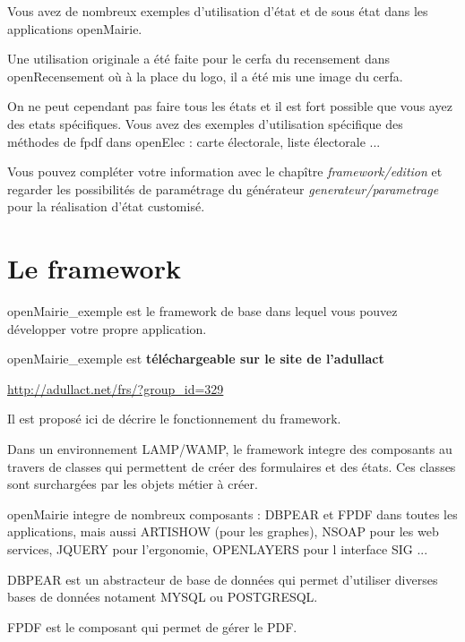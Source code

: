 \documentclass[letterpaper,10pt,french]{manual}
\begin{document}
Vous avez de nombreux exemples d'utilisation d'état et de sous état dans
les applications openMairie.

Une utilisation originale a été faite pour le cerfa du recensement dans
openRecensement où à la place du logo, il a été mis une image du cerfa.

On ne peut cependant pas faire tous les états et il est fort possible que vous ayez des
etats spécifiques. Vous avez des exemples d'utilisation spécifique des méthodes
de fpdf dans openElec : carte électorale, liste électorale ...

Vous pouvez compléter votre information avec le chapître \emph{framework/edition}
et regarder les possibilités de paramétrage du générateur \emph{generateur/parametrage}
pour la réalisation d'état customisé.


\chapter{Le framework}

\resetcurrentobjects
\hypertarget{--doc-framework/index}{}
openMairie\_exemple est le framework de base dans lequel vous pouvez
développer votre propre application.

openMairie\_exemple est \textbf{téléchargeable sur le site de l'adullact}

\href{http://adullact.net/frs/?group\_id=329}{http://adullact.net/frs/?group\_id=329}

Il est proposé ici de décrire le fonctionnement du framework.

Dans un environnement LAMP/WAMP, le framework integre des composants au travers
de classes qui permettent de créer des formulaires et des états.
Ces classes sont surchargées par les objets métier à créer.

openMairie integre de nombreux composants : DBPEAR et FPDF dans toutes les applications,
mais aussi ARTISHOW (pour les graphes), NSOAP pour les web services,
JQUERY pour l'ergonomie, OPENLAYERS pour l interface SIG ...

DBPEAR est un abstracteur de base de données qui permet d'utiliser diverses bases de données notament MYSQL ou POSTGRESQL.

FPDF est le composant qui permet de gérer le PDF.
\end{document}
